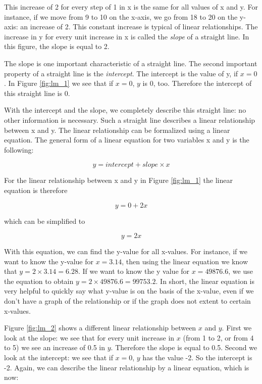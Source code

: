 \documentclass[]{report}\usepackage[]{graphicx}\usepackage[]{color}
\begin{document}
This increase of 2 for every step of 1 in x is the same for all values of x and y. For instance, if we move from 9 to 10 on the x-axis, we go from 18 to 20 on the y-axis: an increase of 2. This constant increase is typical of linear relationships. The increase in y for every unit increase in x is called the \textit{slope} of a straight line. In this figure, the slope is equal to 2.

The slope is one important characteristic of a straight line. The second important property of a straight line is the \textit{intercept}. The intercept is the value of y, if $x=0$. In Figure \ref{fig:lm_1} we see that if $x=0$, $y$ is 0, too. Therefore the intercept of this straight line is 0.

With the intercept and the slope, we completely describe this straight line: no other information is necessary. Such a straight line describes a linear relationship between x and y. The linear relationship can be formalized using a linear equation. The general form of a linear equation for two variables x and y is the following:

\begin{equation}
y = intercept + slope \times x
\end{equation}


For the linear relationship between x and y in Figure \ref{fig:lm_1} the linear equation is therefore

\begin{equation}
y = 0 + 2 x
\end{equation}

which can be simplified to

\begin{equation}
y =  2 x
\end{equation}


With this equation, we can find the y-value for all x-values. For instance, if we want to know the y-value for $x=3.14$, then using the linear equation we know that $y = 2 \times 3.14 = 6.28$. If we want to know the y value for $x=49876.6$, we use the equation to obtain $y=2\times 49876.6 = 99753.2$. In short, the linear equation is very helpful to quickly say what y-value is on the basis of the x-value, even if we don't have a graph of the relationship or if the graph does not extent to certain x-values.

Figure \ref{fig:lm_2} shows a different linear relationship between $x$ and $y$. First we look at the slope: we see that for every unit increase in $x$ (from 1 to 2, or from 4 to 5) we see an increase of 0.5 in $y$. Therefore the slope is equal to 0.5. Second we look at the intercept: we see that if $x=0$, $y$ has the value -2. So the intercept is -2. Again, we can describe the linear relationship by a linear equation, which is now:
\end{document}
